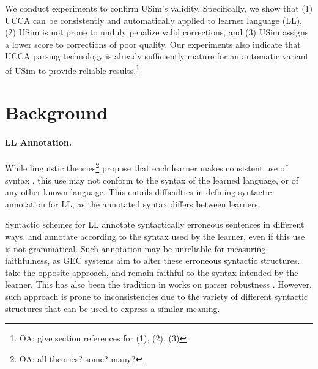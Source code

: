 \documentclass[a4paper, 11pt]{article}
\newcommand{\oa}[1]{\footnote{\color{red}OA: #1}}
\newcommand{\lc}[1]{\footnote{\color{blue}LC: #1}}
\begin{document}

We conduct experiments to confirm {\sc USim}'s validity.
Specifically, we show that
(1) UCCA can be consistently and automatically applied to learner language (LL), 
(2) {\sc USim} is not prone to unduly penalize valid corrections, and 
(3) {\sc USim} assigns a lower score to corrections of poor quality.
Our experiments also indicate that UCCA parsing technology is already sufficiently mature for an automatic variant of {\sc USim} to provide reliable results.\oa{give section references for (1), (2), (3)}


\section{Background}


\paragraph{LL Annotation.}
While linguistic theories\oa{all theories? some? many?} propose that each learner makes consistent use of syntax 
\cite{huebner1985system,tarone1983variability}, this use may not conform to the syntax of the learned language, 
or of any other known language. This entails difficulties in defining syntactic annotation for LL, as the annotated syntax differs between learners.

Syntactic schemes for LL annotate syntactically erroneous sentences in different ways.
 and  annotate according 
to the syntax used by the learner, even if this use is not grammatical.
Such annotation may be unreliable for measuring faithfulness, 
as GEC systems aim to alter these erroneous syntactic structures.
 take the opposite approach, and remain faithful to the syntax intended by the learner.
This has also been the tradition in works on parser robustness 
\cite{bigert2005unsupervised,foster2004parsing}. However, such approach is prone to inconsistencies due to the 
variety of different syntactic structures that can be used to express a similar meaning. 
\end{document}
